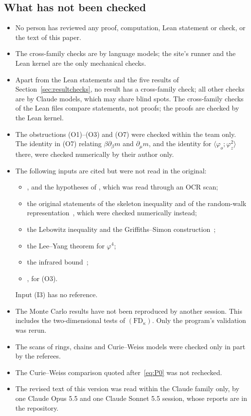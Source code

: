 \subsection{What has not been checked}\label{sec:notchecked}
\begin{itemize}
\item No person has reviewed any proof, computation, Lean statement or check, or the text of this paper.
\item The cross-family checks are by language models; the site's runner and the Lean kernel are the only mechanical checks.
\item Apart from the Lean statements and the five results of Section~\ref{sec:resultchecks}, no result has a cross-family check; all other checks are by Claude models, which may share blind spots. The cross-family checks of the Lean files compare statements, not proofs; the proofs are checked by the Lean kernel.
\item The obstructions (O1)--(O3) and (O7) were checked within the team only. The identity in (O7) relating $\beta\partial_\beta m$ and $\partial_\mu m$, and the identity for $\langle\varphi_o;\varphi_z^2\rangle$ there, were checked numerically by their author only.
\item The following inputs are cited but were not read in the original:
\begin{itemize}
\item \cite[Sect.~8]{BFS83}, and the hypotheses of \cite[Thm.~IX.5]{GRS76}, which was read through an OCR scan;
\item the original statements of the skeleton inequality and of the random-walk representation~\cite{BFS82,FFS92}, which were checked numerically instead;
\item the Lebowitz inequality and the Griffiths--Simon construction~\cite{Leb74,SG73};
\item the Lee--Yang theorem for $\varphi^4$;
\item the infrared bound~\cite{FSS76};
\item \cite{FS81,Mer67}, for (O3).
\end{itemize}
Input (I3) has no reference.
\item The Monte Carlo results have not been reproduced by another session. This includes the two-dimensional tests of $(\mathrm{FD}_\kappa)$. Only the program's validation was rerun.
\item The scans of rings, chains and Curie--Weiss models were checked only in part by the referees.
\item The Curie--Weiss comparison quoted after~\eqref{eq:P0} was not rechecked.
\item The revised text of this version was read within the Claude family only, by one Claude Opus 5.5 and one Claude Sonnet 5.5 session, whose reports are in the repository.
\end{itemize}

